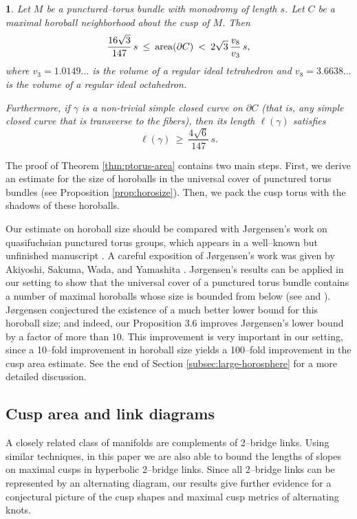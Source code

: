 \documentclass[11pt]{amsart}
\newcommand{\area}{{\rm area}}
\newcommand{\bdy}{{\partial}}
\theoremstyle{plain}
\newtheorem*{namedtheorem}{\theoremname}
\newcommand{\theoremname}{testing}
\newenvironment{named}[1]{\renewcommand{\theoremname}{#1}\begin{namedtheorem}}{\end{namedtheorem}}
\theoremstyle{definition}
\begin{document}
\begin{named}{Theorem \ref{thm:ptorus-area}}
Let $M$ be a punctured--torus bundle with monodromy of length $s$.
Let $C$ be a maximal horoball neighborhood about the cusp of $M$. Then
$$\frac{16 \sqrt{3}}{147} \, s \: \leq \: \area(\bdy C) \:<\: 2
\sqrt{3} \, \frac{v_8}{v_3} \, s,$$
%
where $v_3 = 1.0149...$ is the volume of a regular ideal tetrahedron
and $v_8 = 3.6638...$ is the volume of a regular ideal octahedron.

Furthermore, if $\gamma$ is a non-trivial simple closed curve on $\bdy
C$ (that is, any simple closed curve that is transverse to the
fibers), then its length $\ell(\gamma)$ satisfies
$$ \ell(\gamma) \: \geq \: \frac{4\sqrt{6}}{147} \, s.$$
\end{named}

The proof of Theorem \ref{thm:ptorus-area} contains two main
steps. First, we derive an estimate for the size of horoballs in the
universal cover of punctured torus bundles (see Proposition
\ref{prop:horosize}).  Then, we pack the cusp torus with the shadows
of these horoballs.

Our estimate on horoball size should be compared with J{\o}rgensen's
work on quasifuchsian punctured torus groups, which appears in a
well--known but unfinished manuscript \cite{jorgensen}.  A careful
exposition of J{\o}rgensen's work was given by Akiyoshi, Sakuma, Wada,
and Yamashita \cite{aswy-book}.  J{\o}rgensen's results can be applied
in our setting to show that the universal cover of a punctured torus
bundle contains a number of maximal horoballs whose size is bounded
from below (see \cite[Lemma 4.3]{jorgensen} and \cite[Lemma
8.1.1]{aswy-book}).  J{\o}rgensen conjectured the existence of a much
better lower bound for this horoball size; and indeed, our Proposition
3.6 improves J{\o}rgensen's lower bound by a factor of more than
$10$. This improvement is very important in our setting, since a
10--fold improvement in horoball size yields a 100--fold improvement
in the cusp area estimate.  See the end of Section
\ref{subsec:large-horosphere} for a more detailed discussion.


\subsection{Cusp area and link diagrams}\label{sec:diagram-intro}

A closely related class of manifolds are complements of 2--bridge
links.  Using similar techniques, in this paper we are also able to
bound the lengths of slopes on maximal cusps in hyperbolic 2--bridge
links.  Since all 2--bridge links can be represented by an alternating
diagram, our results give further evidence for a conjectural picture
of the cusp shapes and maximal cusp metrics of alternating knots.
\end{document}
